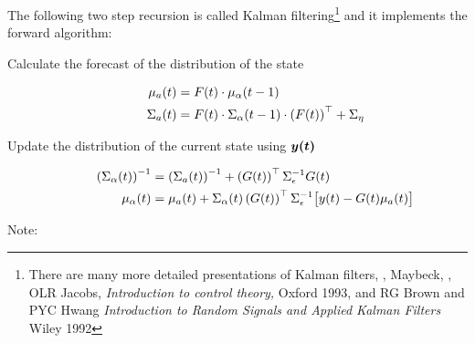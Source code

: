 The following two step recursion is called Kalman 
filtering\footnote{There are many more detailed presentations of Kalman
  filters, \eg, Maybeck\cite{Maybeck82}, \cite{KSH00}, OLR Jacobs,
  \emph{Introduction to control theory,} Oxford 1993, and RG Brown and
  PYC Hwang \emph{Introduction to Random Signals and Applied Kalman
    Filters} Wiley 1992} and it
implements the forward algorithm:                              %
\newcommand{\G}{ \ti{G}{t} }
\newcommand{\GT}{\left( \G \right)\transpose}
\newcommand{\SX}{ \ti{\Sigma_a}{t} }
\begin{description}
\item[Calculate the forecast of the distribution of the state]
  \begin{subequations}
    \label{eq:KFore}
    \begin{align}
      \label{eq:KForeMu}
      {\mu_a}{(t)} &= {F}{(t)} \cdot {\mu_\alpha}{(t-1)}\\
      \label{eq:KForeSigma}
      {\Sigma_a}{(t)} &= {F}{(t)} \cdot {\Sigma_\alpha}{(t-1)}
      \cdot \left({F}{(t)}\right)^\top + \Sigma_\eta
    \end{align}
  \end{subequations}
\item[Update the distribution of the current state using
  $\bm{{y}{(t)}}$]
  \begin{subequations}
    \label{eq:KUpdate}
    \begin{align}
      \label{eq:KUpdateSigma}
      \left( \ti{\Sigma_\alpha}{t} \right)^{-1} &= \left(
        \ti{\Sigma_a}{t} \right)^{-1} + \GT \Sigma_\epsilon^{-1} \G \\
      \ti{\mu_\alpha}{t} &= \ti{\mu_a}{t} +
      \ti{\Sigma_{\alpha}}{t} \left( \ti{G}{t} \right)\transpose
      \Sigma_\epsilon^{-1} \big[\ti{y}{t} - \ti{G}{t}
      \ti{\mu_a}{t}\big]
    \end{align}
  \end{subequations}
\end{description}
Note:
